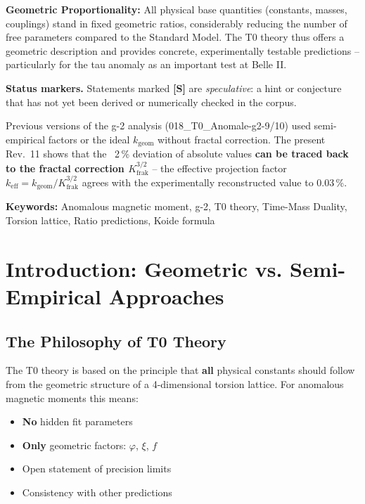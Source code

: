 		\textbf{Geometric Proportionality:} All physical base quantities (constants, masses, couplings) stand in fixed geometric ratios, considerably reducing the number of free parameters compared to the Standard Model. The T0 theory thus offers a geometric description and provides concrete, experimentally testable predictions – particularly for the tau anomaly as an important test at Belle II.

	\medskip\noindent\textbf{Status markers.} Statements marked \textbf{[S]} are \emph{speculative}: a hint or conjecture that has not yet been derived or numerically checked in the corpus.


	
	\begin{tcolorbox}[colback=yellow!10!white, colframe=orange!75!black, title=Note on Older Documents]
		Previous versions of the g-2 analysis (018\_T0\_Anomale-g2-9/10) used semi-empirical factors or the ideal $k_\text{geom}$ without fractal correction. The present Rev.~11 shows that the ~2\,\% deviation of absolute values \textbf{can be traced back to the fractal correction $K_\text{frak}^{3/2}$} -- the effective projection factor $k_\text{eff} = k_\text{geom}/K_\text{frak}^{3/2}$ agrees with the experimentally reconstructed value to 0.03\,\%.
	\end{tcolorbox}
	
	\textbf{Keywords:} Anomalous magnetic moment, g-2, T0 theory, Time-Mass Duality, Torsion lattice, Ratio predictions, Koide formula
	
	
	\section{Introduction: Geometric vs. Semi-Empirical Approaches}
	
	\subsection{The Philosophy of T0 Theory}
	
	The T0 theory is based on the principle that \textbf{all} physical constants should follow from the geometric structure of a 4-dimensional torsion lattice. For anomalous magnetic moments this means:
	
	\begin{itemize}
		\item \textbf{No} hidden fit parameters
		\item \textbf{Only} geometric factors: $\varphi$, $\xi$, $f$
		\item Open statement of precision limits
		\item Consistency with other predictions
	\end{itemize}
	
